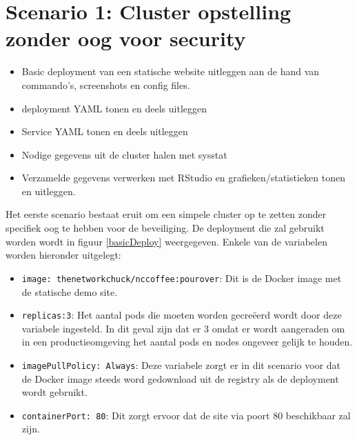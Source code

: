 \clearpage
\section{Scenario 1: Cluster opstelling zonder oog voor security}
\begin{itemize}
	\item Basic deployment van een statische website uitleggen aan de hand van commando's, screenshots en config files. 
	\item deployment YAML tonen en deels uitleggen
	\item Service YAML tonen en deels uitleggen
	\item Nodige gegevens uit de cluster halen met sysstat
	\item Verzamelde gegevens verwerken met RStudio en grafieken/statistieken tonen en uitleggen.
\end{itemize}

Het eerste scenario bestaat eruit om een simpele cluster op te zetten zonder specifiek oog te hebben voor de beveiliging. De deployment die zal gebruikt worden wordt in figuur \ref{basicDeploy} weergegeven. Enkele van de variabelen worden hieronder uitgelegt: 
\begin{itemize}
	\item \verb|image: thenetworkchuck/nccoffee:pourover|: Dit is de Docker image met de statische demo site.
	\item \verb|replicas:3|: Het aantal pods die moeten worden gecreëerd wordt door deze variabele ingesteld. In dit geval zijn dat er 3 omdat er wordt aangeraden om in een productieomgeving het aantal pods en nodes ongeveer gelijk te houden.
	\item \verb|imagePullPolicy: Always|: Deze variabele zorgt er in dit scenario voor dat de Docker image steeds word gedownload uit de registry als de deployment wordt gebruikt.
	\item \verb|containerPort: 80|: Dit zorgt ervoor dat de site via poort 80 beschikbaar zal zijn.
\end{itemize}

